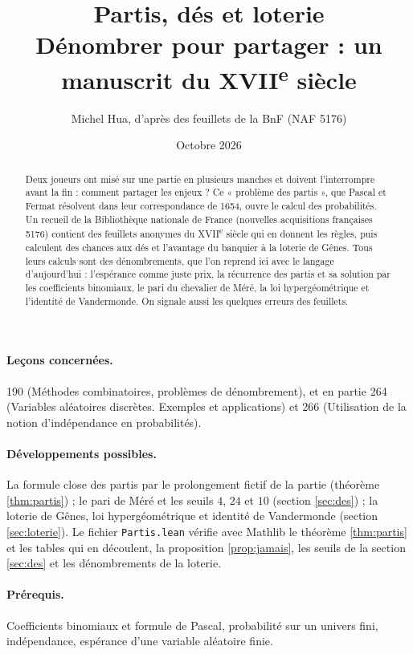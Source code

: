 \documentclass[11pt,a4paper]{article}
\title{Partis, dés et loterie\\[2pt]
\large Dénombrer pour partager : un manuscrit du XVII\textsuperscript{e} siècle}
\author{Michel Hua, d'après des feuillets de la BnF (NAF 5176)}
\date{Octobre 2026}
\theoremstyle{plain}
\theoremstyle{definition}
\theoremstyle{remark}
\begin{document}
\maketitle

\begin{abstract}
Deux joueurs ont misé sur une partie en plusieurs manches et doivent l'interrompre avant la fin : comment partager les enjeux ? Ce « problème des partis », que Pascal et Fermat résolvent dans leur correspondance de 1654, ouvre le calcul des probabilités. Un recueil de la Bibliothèque nationale de France (nouvelles acquisitions françaises 5176) contient des feuillets anonymes du XVII\textsuperscript{e} siècle qui en donnent les règles, puis calculent des chances aux dés et l'avantage du banquier à la loterie de Gênes. Tous leurs calculs sont des dénombrements, que l'on reprend ici avec le langage d'aujourd'hui : l'espérance comme juste prix, la récurrence des partis et sa solution par les coefficients binomiaux, le pari du chevalier de Méré, la loi hypergéométrique et l'identité de Vandermonde. On signale aussi les quelques erreurs des feuillets.
\end{abstract}

\paragraph{Leçons concernées.} 190 (Méthodes combinatoires, problèmes de dénombrement), et en partie 264 (Variables aléatoires discrètes. Exemples et applications) et 266 (Utilisation de la notion d'indépendance en probabilités).

\paragraph{Développements possibles.} La formule close des partis par le prolongement fictif de la partie (théorème \ref{thm:partis}) ; le pari de Méré et les seuils $4$, $24$ et $10$ (section \ref{sec:des}) ; la loterie de Gênes, loi hypergéométrique et identité de Vandermonde (section \ref{sec:loterie}). Le fichier \texttt{Partis.lean} vérifie avec Mathlib le théorème \ref{thm:partis} et les tables qui en découlent, la proposition \ref{prop:jamais}, les seuils de la section \ref{sec:des} et les dénombrements de la loterie.

\paragraph{Prérequis.} Coefficients binomiaux et formule de Pascal, probabilité sur un univers fini, indépendance, espérance d'une variable aléatoire finie.
\end{document}
